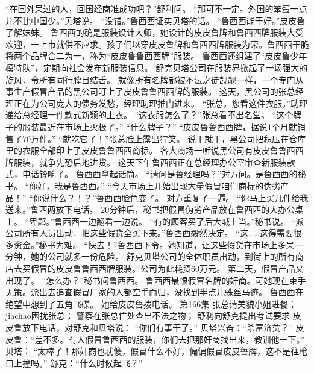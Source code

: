 \documentclass[a4paper,12pt,UTF8,twoside]{ctexbook}
\begin{document}
        “在国外呆过的人，回国经商准成功吧？”舒利问。 
        “那可不一定。外国的笨蛋一点儿不比中国少。”贝塔说。 
        “没错。”鲁西西证实贝塔的话。 
        “鲁西西能干好。”皮皮鲁了解妹妹。 
        鲁西西的确是服装设计大师，她设计的皮皮鲁牌和鲁西西牌服装大受欢迎，一上市就供不应求。孩子们以穿皮皮鲁牌和鲁西西牌服装为荣。鲁西西干脆将两个品牌合二为一，称为“皮皮鲁鲁西西牌”服装。 
        鲁西西还组建了“皮皮鲁少年模特队”，定期向社会发布新服装信息。 
        舒克贝塔公司在服装界掀起了一场强大的旋风．令所有同行膛目结舌。 
        就像所有名牌都被不法之徒觊觎一样，一个专门从事生产假冒产品的黑公司盯上了皮皮鲁鲁西西牌的服装。 
        这天，黑公司的张总经理正在为公司庞大的债务发愁，经理助理推门进来。 
        “张总，您看这件衣服。”助理递给总经理一件款式新颖的上衣。 
        “这衣服怎么了？”张总看不出名堂。 
        “这个牌子的服装最近在市场上火极了。” 
        “什么牌子？” 
        “皮皮鲁鲁西西牌，据说1个月就销售了70万件。” 
        “就吃它了！”张总脸上露出狞笑。 
        说干就干，黑公司把积压在仓库里的衣服全部印上了皮皮鲁鲁西西商标。 
        各大商场一听说黑公司有皮皮鲁鲁西西牌服装，就争先恐后地进货。 
        这天下午鲁西西正在总经理办公室审查新服装款式，电话铃响了。 
        鲁西西拿起话筒。 
        “请问是鲁经理吗？”对方问。是鲁西西的秘书。 
        “你好，我是鲁西西。” 
        “今天市场上开始出现大量假冒咱们商标的伪劣产品！” 
        “你说什么？！？”鲁西西脸色变了。 
        对方重复了一遍。 
        “你马上买几件给我送来。”鲁西两放下电话。 
        20分钟后，秘书把假冒伪劣产品放在鲁西西的大办公桌上。 
        “卑鄙。”鲁西西一边翻看一边说。 
        “有的顾客买了后大喊上当。”秘书说。 
        “派公司所有人员出动．把这些假货全买下来。”鲁西西毅然决定。 
        “这……这得需要很多资金。”秘书为难。 
        “快去！”鲁西西下令。她知道，让这些假货在市场上多呆一分钟，她的公司就多一份危险。 
        舒克贝塔公司的全体职员出动，到街上的所有商店去买假冒的皮皮鲁鲁西西牌服装。公司为此耗资60万元。 
        第二天，假冒产品又出现了。 
        “怎么办？”秘书问鲁西西。 
        鲁西西最恨假冒名牌的奸商。可她现在束手无策。派出去追查假冒厂家的人都空手而归，没找到半点儿蛛丝马迹。 
        鲁西西在绝望中想到了五角飞碟。 
        她给皮皮鲁拨电话。   第166集 
        张总请美貌小姐进餐； 
        jiachao困扰张总； 
        警察在张总住处查出不法之物； 
        舒利向舒克提出考试要求   
        皮皮鲁放下电话，对舒克和贝塔说： 
        “你们有事干了。” 
        贝塔兴奋：“杀富济贫？” 
        皮皮鲁：“差不多。有人假冒鲁西西的服装，你们去把那奸商找出来，教训他一下。” 
        贝塔：  “太棒了！那奸商也忒傻，假冒什么不好，偏偏假冒皮皮鲁牌，这不是往枪口上撞吗。” 
        舒克：“什么时候起飞？” 
\end{document}
